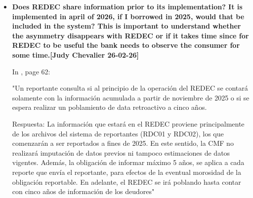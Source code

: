 \documentclass[12pt]{article}
\theoremstyle{plain}
\theoremstyle{plain}
\theoremstyle{definition}  %
\theoremstyle{remark}  %
\begin{document}
\begin{itemize}
    Qué hace el REDEC (Ley 21.680): Va mucho más allá del artículo 14 LGB. Define su propio universo de reportantes en el artículo 2(e), que incluye a todas las entidades que ya reportaban más un conjunto de entidades que no estaban en el artículo 14 [1]:
    \begin{itemize}
        \item Compañías de seguro
        \item Agentes administradores de mutuos hipotecarios endosables (mutuarias)
        \item Cajas de compensación de asignación familiar
        \item Sociedades securitizadoras
        \item Asesores crediticios (Ley Fintec)
        \item Cualquier persona natural o jurídica que supere 100.000 UF o 1.000 operaciones anuales de crédito
    \end{itemize}

    OCNB (Oferentes de Credito No Bancarios) incluye a los ETNB, pero tambien otras entidades comoo las cajas de compensacion. 

    \item \textbf{Does REDEC share information prior to its implementation? It is implemented in april of 2026, if I borrowed in 2025, would that be included in the system? This is important to understand whether the asymmetry disappears with REDEC or if it takes time since for REDEC to be useful the bank needs to observe the consumer for some time.[Judy Chevalier 26-02-26]}


    In \textcite{cmf_informe_2025}, page 62: 

    "Un reportante consulta si al principio de la operación del REDEC se contará solamente con la información acumulada a partir de noviembre de 2025 o si se espera realizar un poblamiento de data retroactivo a cinco años.  

    Respuesta: La información que estará en el REDEC proviene principalmente de los archivos del sistema de reportantes (RDC01 y RDC02), los que comenzarán a ser reportados a fines de 2025. En este sentido, la CMF no realizará imputación de datos previos ni tampoco estimaciones de datos vigentes. Además, la obligación de informar máximo 5 años, se aplica a cada reporte que envía el reportante, para efectos de la eventual morosidad de la obligación reportable. En adelante, el REDEC se irá poblando hasta contar con cinco años de información de los deudores" 


\end{itemize}
\end{document}
